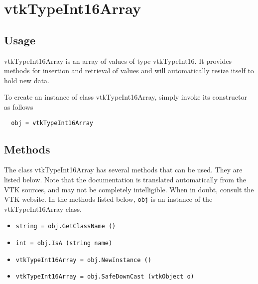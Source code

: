 \section{vtkTypeInt16Array}

\subsection{Usage}

 vtkTypeInt16Array is an array of values of type vtkTypeInt16.  It
 provides methods for insertion and retrieval of values and will
 automatically resize itself to hold new data.

To create an instance of class vtkTypeInt16Array, simply
invoke its constructor as follows
\begin{verbatim}
  obj = vtkTypeInt16Array
\end{verbatim}
\subsection{Methods}

The class vtkTypeInt16Array has several methods that can be used.
  They are listed below.
Note that the documentation is translated automatically from the VTK sources,
and may not be completely intelligible.  When in doubt, consult the VTK website.
In the methods listed below, \verb|obj| is an instance of the vtkTypeInt16Array class.
\begin{itemize}
\item  \verb|string = obj.GetClassName ()|

\item  \verb|int = obj.IsA (string name)|

\item  \verb|vtkTypeInt16Array = obj.NewInstance ()|

\item  \verb|vtkTypeInt16Array = obj.SafeDownCast (vtkObject o)|

\end{itemize}
